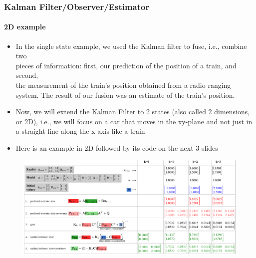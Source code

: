 \begin{frame}[plain]\pw\Large
\frametitle{Kalman Filter/Observer/Estimator}
\framesubtitle{2D example}


\scriptsize
\begin{itemize}
\item In the single state example, we used the Kalman filter to fuse, i.e., combine two\\ pieces of information: first, our prediction of the position of a train, and second,\\ the measurement of the train's position obtained from a radio ranging system.  The result of our fusion was an estimate of the train's position.
\item Now, we will extend the Kalman Filter to 2 states (also called 2 dimensions, or 2D), i.e., we will focus on a car that moves in the xy-plane and not just in a straight line along the x-axis like a train
\item Here is an example in 2D followed by its code on the next 3 slides
\end{itemize}
\vspace{-0.18in}
\begin{figure}[h]
\centering
\includegraphics[width=1.4\textwidth]{figs/TRK_KalmanFilter_example.pdf}
\end{figure}

\end{frame}



